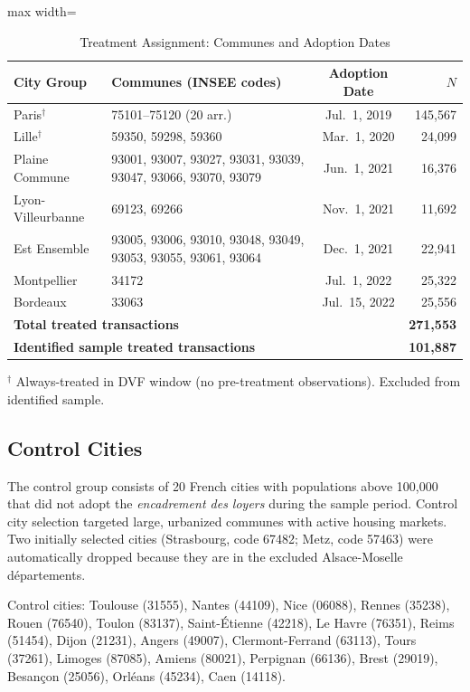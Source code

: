 \documentclass[12pt]{article}
\begin{document}
\begin{table}[H]
\centering
\caption{Treatment Assignment: Communes and Adoption Dates}
\label{tab:treatment_map}
\begin{adjustbox}{max width=\textwidth}
\begin{tabular}{lp{5.5cm}cr}
\toprule
City Group & Communes (INSEE codes) & Adoption Date & $N$ \\
\midrule
Paris$^\dagger$ & 75101--75120 (20 arr.) & Jul.\ 1, 2019 & 145,567 \\
Lille$^\dagger$ & 59350, 59298, 59360 & Mar.\ 1, 2020 & 24,099 \\
Plaine Commune & 93001, 93007, 93027, 93031, 93039, 93047, 93066, 93070, 93079 & Jun.\ 1, 2021 & 16,376 \\
Lyon-Villeurbanne & 69123, 69266 & Nov.\ 1, 2021 & 11,692 \\
Est Ensemble & 93005, 93006, 93010, 93048, 93049, 93053, 93055, 93061, 93064 & Dec.\ 1, 2021 & 22,941 \\
Montpellier & 34172 & Jul.\ 1, 2022 & 25,322 \\
Bordeaux & 33063 & Jul.\ 15, 2022 & 25,556 \\
\midrule
\multicolumn{3}{l}{\textbf{Total treated transactions}} & \textbf{271,553} \\
\multicolumn{3}{l}{\textbf{Identified sample treated transactions}} & \textbf{101,887} \\
\bottomrule
\end{tabular}
\end{adjustbox}
\vspace{0.3em}
{\small $^\dagger$ Always-treated in DVF window (no pre-treatment observations). Excluded from identified sample.}
\end{table}

\subsection{Control Cities}

The control group consists of 20 French cities with populations above 100,000 that did not adopt the \emph{encadrement des loyers} during the sample period. Control city selection targeted large, urbanized communes with active housing markets. Two initially selected cities (Strasbourg, code 67482; Metz, code 57463) were automatically dropped because they are in the excluded Alsace-Moselle d\'epartements.

Control cities: Toulouse (31555), Nantes (44109), Nice (06088), Rennes (35238), Rouen (76540), Toulon (83137), Saint-\'Etienne (42218), Le Havre (76351), Reims (51454), Dijon (21231), Angers (49007), Clermont-Ferrand (63113), Tours (37261), Limoges (87085), Amiens (80021), Perpignan (66136), Brest (29019), Besan\c{c}on (25056), Orl\'eans (45234), Caen (14118).
\end{document}
